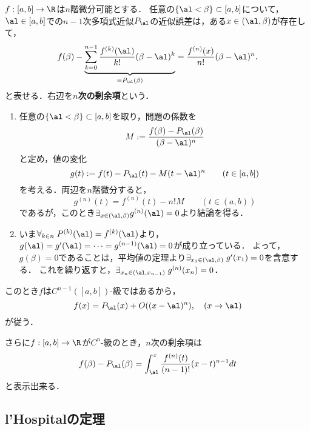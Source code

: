 \documentclass[uplatex,dvipdfmx]{jsarticle}
\begin{document}
\begin{theorem}
    $f:[a,b]\to\R$は$n$階微分可能とする．
    任意の$\{\al<\beta\}\subset[a,b]$について，$\al\in[a,b]$での$n-1$次多項式近似$P_\al$の近似誤差は，ある$x\in(\al,\beta)$が存在して，
    \[f(\beta)-\underbrace{\sum_{k=0}^{n-1}\frac{f^{(k)}(\al)}{k!}(\beta-\al)^k}_{=P_\al(\beta)}=\frac{f^{(n)}(x)}{n!}(\beta-\al)^n.\]
    と表せる．右辺を\textbf{$n$次の剰余項}という．
\end{theorem}
\begin{Proof}\mbox{}
    \begin{enumerate}[{Step}1]
        \item 任意の$\{\al<\beta\}\subset[a,b]$を取り，問題の係数を
        \[M:=\frac{f(\beta)-P_\al(\beta)}{(\beta-\al)^n}\]
        と定め，値の変化
        \[g(t):=f(t)-P_\al(t)-M(t-\al)^n\qquad(t\in[a,b])\]
        を考える．両辺を$n$階微分すると，
        \[g^{(n)}(t)=f^{(n)}(t)-n!M\qquad(t\in(a,b))\]
        であるが，このとき$\exists_{x\in(\al,\beta)}g^{(n)}(\al)=0$より結論を得る．
        \item いま$\forall_{k\in n}\;P^{(k)}(\al)=f^{(k)}(\al)$より，$g(\al)=g'(\al)=\cdots=g^{(n-1)}(\al)=0$が成り立っている．
        よって，$g(\beta)=0$であることは，平均値の定理より$\exists_{x_1\in(\al,\beta)}\;g'(x_1)=0$を含意する．
        これを繰り返すと，$\exists_{x_n\in(\al,x_{n-1})}\;g^{(n)}(x_n)=0$．
    \end{enumerate}
\end{Proof}
\begin{remarks}
    このとき$f$は$C^{n-1}([a,b])$-級ではあるから，
    \[f(x)=P_\al(x)+O((x-\al)^n),\quad(x\to\al)\]
    が従う．
\end{remarks}

\begin{proposition}
    さらに$f:[a,b]\to\R$が$C^n$-級のとき，$n$次の剰余項は
    \[f(\beta)-P_\al(\beta)=\int^x_\al\frac{f^{(n)}(t)}{(n-1)!}(x-t)^{n-1}dt\]
    と表示出来る．
\end{proposition}

\subsection{l'Hospitalの定理}
\end{document}
